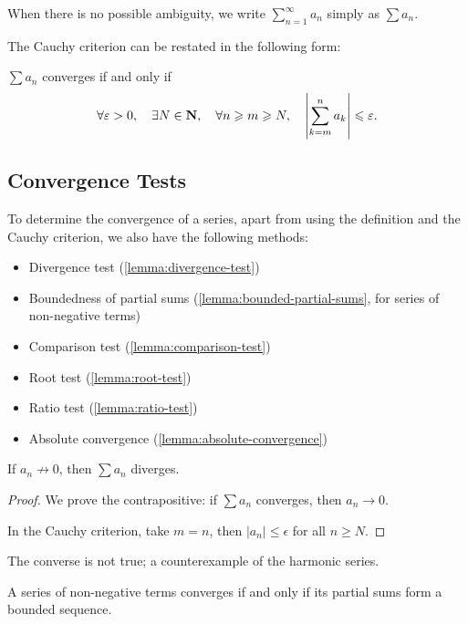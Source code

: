 \begin{notation}
When there is no possible ambiguity, we write $\displaystyle\sum_{n=1}^{\infty}a_n$ simply as $\sum a_n$.
\end{notation}

The Cauchy criterion can be restated in the following form:

\begin{proposition}
$\sum a_n$ converges if and only if
\[\forall\varepsilon>0,\quad\exists N\in\mathbf N,\quad\forall n\geqslant m\geqslant N,\quad\left|\sum_{k=m}^n a_k\right|\leqslant\varepsilon.\]
\end{proposition}

\subsection{Convergence Tests}
To determine the convergence of a series, apart from using the definition and the Cauchy criterion, we also have the following methods:
\begin{itemize}
\item Divergence test (\cref{lemma:divergence-test})
\item Boundedness of partial sums (\cref{lemma:bounded-partial-sums}, for series of non-negative terms)
\item Comparison test (\cref{lemma:comparison-test})
\item Root test (\cref{lemma:root-test})
\item Ratio test (\cref{lemma:ratio-test})
\item Absolute convergence (\cref{lemma:absolute-convergence})
\end{itemize}

\begin{lemma}\label{lemma:divergence-test}
If $a_n\not\to0$, then $\sum a_n$ diverges.
\end{lemma}

\begin{proof}
We prove the contrapositive: if $\sum a_n$ converges, then $a_n\to0$.

In the Cauchy criterion, take $m=n$, then $|a_n|\le\epsilon$ for all $n\ge N$.
\end{proof}

\begin{remark}
The converse is not true; a counterexample of the harmonic series.
\end{remark}

\begin{lemma}\label{lemma:bounded-partial-sums}
A series of non-negative terms converges if and only if its partial sums form a bounded sequence.
\end{lemma}


